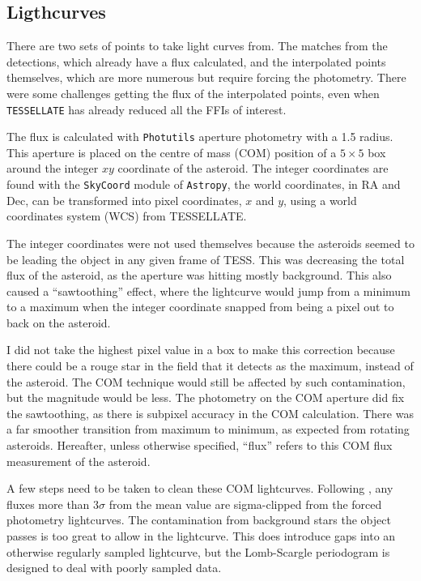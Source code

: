 \documentclass{UCreport}
\begin{document}
\subsection{Ligthcurves}\label{SubSec:Lightcurves}

There are two sets of points to take light curves from.
The matches from the detections, which already have a flux calculated, and the interpolated points themselves, which are more numerous but require forcing the photometry.
There were some challenges getting the flux of the interpolated points, even when \texttt{TESSELLATE} has already reduced all the FFIs of interest.

The flux is calculated with \texttt{Photutils} \citep{Bradley2024} aperture photometry with a \qty{1.5}{\px} radius.
This aperture is placed on the centre of mass (COM) position of a $5\times5$ \unit{\px} box around the integer $xy$ coordinate of the asteroid.  
The integer coordinates are found with the \texttt{SkyCoord} module of \texttt{Astropy}, the world coordinates, in RA and Dec, can be transformed into pixel coordinates, $x$ and $y$, using a world coordinates system (WCS) from TESSELLATE.

The integer coordinates  were not used themselves because the asteroids seemed to be leading the object in any given frame of TESS. %
This was decreasing the total flux of the asteroid, as the aperture  was hitting mostly background.
This also caused a ``sawtoothing'' effect, where the lightcurve would jump from a minimum to a maximum when the integer coordinate snapped from being a pixel out to back on the asteroid.

I did not take the highest pixel value in a box to make this correction because there could be a rouge star in the field that it detects as the maximum, instead of the asteroid.
The COM technique would still be affected by such contamination, but the magnitude would be less. 
The photometry on the COM aperture did fix the sawtoothing, as there is subpixel accuracy in the COM calculation.  
There was a far smoother transition from maximum to minimum, as expected from rotating asteroids. 
Hereafter, unless otherwise specified, ``flux'' refers to this COM flux measurement of the asteroid.


A few steps need to be taken to clean these COM lightcurves.
Following \citet{McNeill2023}, any fluxes more than $3\sigma$ from the mean value are sigma-clipped from the forced photometry lightcurves.
The contamination from background stars the object passes is too great to allow in the lightcurve.
This does introduce gaps into an otherwise regularly sampled lightcurve, but the Lomb-Scargle periodogram is designed to deal with poorly sampled data. 
\end{document}
